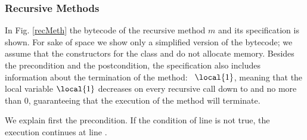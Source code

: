 \subsubsection{Recursive Methods} In Fig. \ref{recMeth} the bytecode of the recursive method $m$ and its specification is shown. For sake of space we show only a simplified version of the bytecode; we assume that the constructors for the class  and  do not allocate memory. Besides the precondition and the postcondition, the specification also includes information about the termination of the method: \variant\ $\local{1}$, meaning that the local variable $\local{1}$ decreases on every recursive call down to and no more than $0$, guaranteeing that the execution of the method will terminate.
 

We explain first the precondition. If the condition of line  is not true, the execution continues at line .

